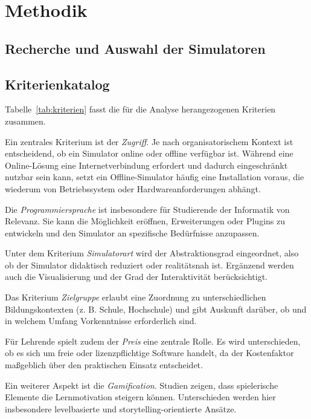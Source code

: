 \chapter{Methodik}

\section{Recherche und Auswahl der Simulatoren}

\section{Kriterienkatalog}

Tabelle~\ref{tab:kriterien} fasst die für die Analyse herangezogenen Kriterien zusammen.

Ein zentrales Kriterium ist der \textit{Zugriff}. Je nach organisatorischem Kontext ist entscheidend, ob ein Simulator online oder offline verfügbar ist. Während eine Online-Lösung eine Internetverbindung erfordert und dadurch eingeschränkt nutzbar sein kann, setzt ein Offline-Simulator häufig eine Installation voraus, die wiederum von Betriebssystem oder Hardwareanforderungen abhängt.

Die \textit{Programmiersprache} ist insbesondere für Studierende der Informatik von Relevanz. Sie kann die Möglichkeit eröffnen, Erweiterungen oder Plugins zu entwickeln und den Simulator an spezifische Bedürfnisse anzupassen.

Unter dem Kriterium \textit{Simulatorart} wird der Abstraktionsgrad eingeordnet, also ob der Simulator didaktisch reduziert oder realitätsnah ist. Ergänzend werden auch die Visualisierung und der Grad der Interaktivität berücksichtigt.

Das Kriterium \textit{Zielgruppe} erlaubt eine Zuordnung zu unterschiedlichen Bildungskontexten (z. B. Schule, Hochschule) und gibt Auskunft darüber, ob und in welchem Umfang Vorkenntnisse erforderlich sind.

Für Lehrende spielt zudem der \textit{Preis} eine zentrale Rolle. Es wird unterschieden, ob es sich um freie oder lizenzpflichtige Software handelt, da der Kostenfaktor maßgeblich über den praktischen Einsatz entscheidet.

Ein weiterer Aspekt ist die \textit{Gamification}. Studien zeigen, dass spielerische Elemente die Lernmotivation steigern können. Unterschieden werden hier insbesondere levelbasierte und storytelling-orientierte Ansätze.

